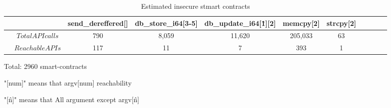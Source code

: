 
\begin{table}[!t]
\caption{Estimated insecure stmart contracts}
\label{escvTable}
\begin{tabular} {ccccccccccc}
\hline\hline
& & send\_dereffered[] & db\_store\_i64[3-5] & db\_update\_i64[\^1][2] & memcpy[2] & strcpy[2] \\
\hline
& $Total API calls$	& 790 	&  	8,059	& 11,620	& 205,033 	& 63	&\\
& $Reachable APIs$	&  117 	&	11		& 7			& 393		& 1		&\\
\hline\hline
\end{tabular}
\begin{tablenotes}
\item Total: 2960 smart-contracts
\item "[num]" means that argv[num] reachability
\item "[\^n]" means that All argument except argv[\^n]
\end{tablenotes}


\end{table}
